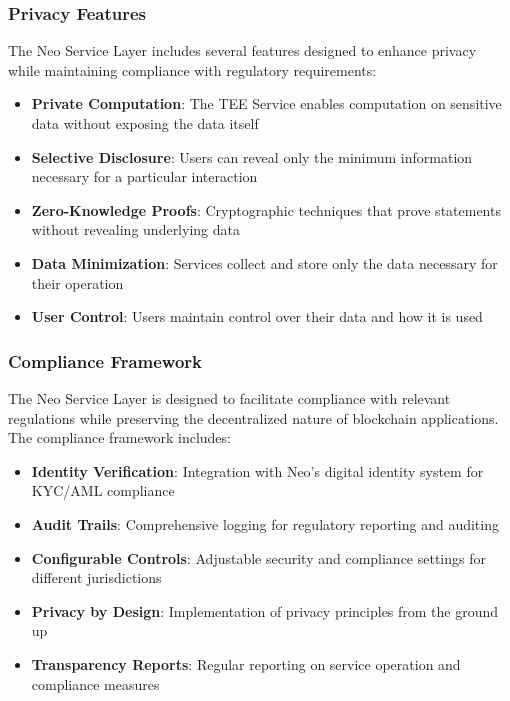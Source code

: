 \documentclass{article}
\begin{document}
\subsubsection{Privacy Features}
\label{subsubsec:privacy-features}

The Neo Service Layer includes several features designed to enhance privacy while maintaining compliance with regulatory requirements:

\begin{itemize}
    \item \textbf{Private Computation}: The TEE Service enables computation on sensitive data without exposing the data itself
    \item \textbf{Selective Disclosure}: Users can reveal only the minimum information necessary for a particular interaction
    \item \textbf{Zero-Knowledge Proofs}: Cryptographic techniques that prove statements without revealing underlying data
    \item \textbf{Data Minimization}: Services collect and store only the data necessary for their operation
    \item \textbf{User Control}: Users maintain control over their data and how it is used
\end{itemize}

\subsubsection{Compliance Framework}
\label{subsubsec:compliance-framework}

The Neo Service Layer is designed to facilitate compliance with relevant regulations while preserving the decentralized nature of blockchain applications. The compliance framework includes:

\begin{itemize}
    \item \textbf{Identity Verification}: Integration with Neo's digital identity system for KYC/AML compliance
    \item \textbf{Audit Trails}: Comprehensive logging for regulatory reporting and auditing
    \item \textbf{Configurable Controls}: Adjustable security and compliance settings for different jurisdictions
    \item \textbf{Privacy by Design}: Implementation of privacy principles from the ground up
    \item \textbf{Transparency Reports}: Regular reporting on service operation and compliance measures
\end{itemize}
\end{document}
